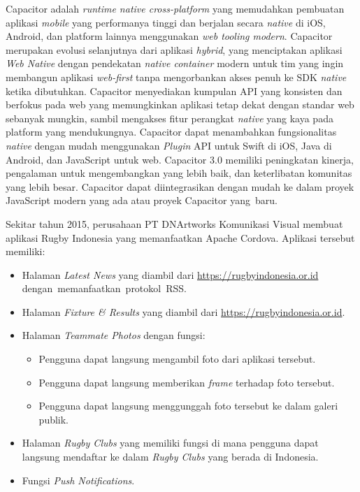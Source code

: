 \documentclass[a4paper,twoside]{article}
\begin{document}
Capacitor adalah \textit{runtime native cross-platform} yang memudahkan pembuatan aplikasi \textit{mobile} yang performanya tinggi dan berjalan secara \textit{native} di iOS, Android, dan platform lainnya menggunakan \textit{web tooling modern}. Capacitor merupakan evolusi selanjutnya dari aplikasi \textit{hybrid}, yang menciptakan aplikasi \textit{Web Native} dengan pendekatan \textit{native container} modern untuk tim yang ingin membangun aplikasi \textit{web-first} tanpa mengorbankan akses penuh ke SDK \textit{native} ketika dibutuhkan. Capacitor menyediakan kumpulan API yang konsisten dan berfokus pada web yang memungkinkan aplikasi tetap dekat dengan standar web sebanyak mungkin, sambil mengakses fitur perangkat \textit{native} yang kaya pada platform yang mendukungnya. Capacitor dapat menambahkan fungsionalitas \textit{native} dengan mudah menggunakan \textit{Plugin} API untuk Swift di iOS, Java di Android, dan JavaScript untuk web. Capacitor 3.0 memiliki peningkatan kinerja, pengalaman untuk mengembangkan yang lebih baik, dan keterlibatan komunitas yang lebih besar. Capacitor dapat diintegrasikan dengan mudah ke dalam proyek JavaScript modern yang ada atau proyek Capacitor yang~baru.

Sekitar tahun 2015, perusahaan PT DNArtworks Komunikasi Visual membuat aplikasi Rugby Indonesia yang memanfaatkan Apache Cordova. Aplikasi tersebut memiliki: 
\begin{itemize}
    \item Halaman \textit{Latest News} yang diambil dari \url{https://rugbyindonesia.or.id} dengan~memanfaatkan~protokol~RSS.
    \item Halaman \textit{Fixture \& Results} yang diambil dari \url{https://rugbyindonesia.or.id}.
    \item Halaman \textit{Teammate Photos} dengan fungsi:
    \begin{itemize}
        \item Pengguna dapat langsung mengambil foto dari aplikasi tersebut.
        \item Pengguna dapat langsung memberikan \textit{frame} terhadap foto tersebut.
        \item Pengguna dapat langsung menggunggah foto tersebut ke dalam galeri publik.
    \end{itemize}
    \item Halaman \textit{Rugby Clubs} yang memiliki fungsi di mana pengguna dapat langsung mendaftar ke dalam \textit{Rugby Clubs} yang berada di Indonesia.
    \item Fungsi \textit{Push Notifications}.
\end{itemize}
\end{document}
